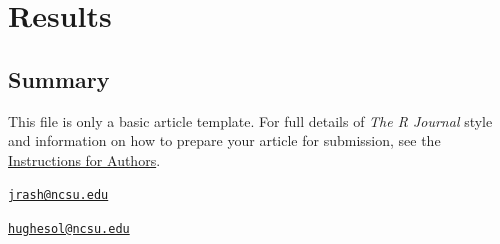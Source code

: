 \section{Results}\label{results}

\subsection{Summary}\label{summary}

This file is only a basic article template. For full details of
\emph{The R Journal} style and information on how to prepare your
article for submission, see the
\href{https://journal.r-project.org/share/author-guide.pdf}{Instructions
for Authors}. 

\address{%
Jeremy Ash\\
Department of Bioinformatics, Department of Statistics, North Carolina
State University\\
Raleigh, NC 27695-8203, USA\\
}
\href{mailto:jrash@ncsu.edu}{\nolinkurl{jrash@ncsu.edu}}

\address{%
Jacqueline Hughes-Oliver\\
Department of Statistics, North Carolina State University\\
Raleigh, NC 27695-8203, USA\\
}
\href{mailto:hughesol@ncsu.edu}{\nolinkurl{hughesol@ncsu.edu}}

